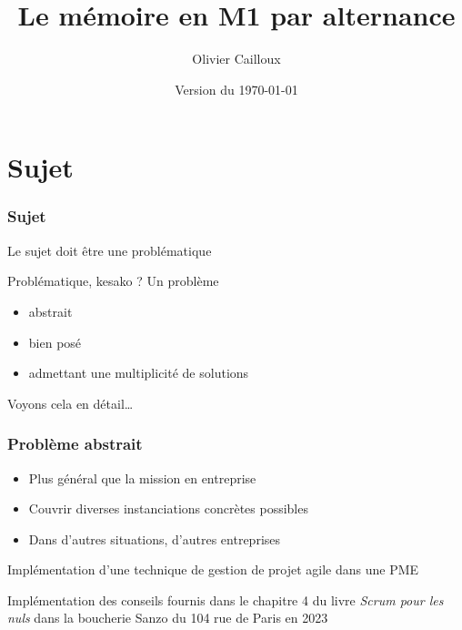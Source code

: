\documentclass[french]{beamer}
\title{Le mémoire en M1 par alternance}
\author{Olivier Cailloux}
\institute[LAMSADE]{\inst{1} LAMSADE, Université Paris-Dauphine}
\date{Version du \today}
\begin{document}
\begin{frame}[plain]
	\titlepage
\end{frame}
\addtocounter{framenumber}{-1}

\section{Sujet}
\begin{frame}
	\frametitle{Sujet}
	Le sujet doit être une problématique
	\begin{block}{Problématique, kesako ?}
		Un problème
		\begin{itemize}
			\item abstrait
			\item bien posé
			\item admettant une multiplicité de solutions
		\end{itemize}
	\end{block}
	Voyons cela en détail…
\end{frame}

\begin{frame}
	\frametitle{Problème abstrait}
	\begin{itemize}
		\item Plus général que la mission en entreprise
		\item Couvrir diverses instanciations concrètes possibles
		\item Dans d’autres situations, d’autres entreprises
	\end{itemize}
	\begin{example}
		Implémentation d’une technique de gestion de projet agile dans une PME
	\end{example}
	\begin{example}
		Implémentation des conseils fournis dans le chapitre 4 du livre \emph{Scrum pour les nuls} dans la boucherie Sanzo du 104 rue de Paris en 2023
	\end{example}
\end{frame}
\end{document}

